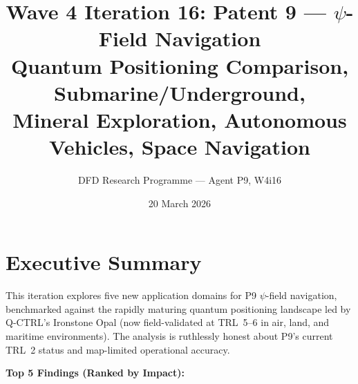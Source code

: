 \documentclass[11pt]{article}
\title{\textbf{Wave 4 Iteration 16: Patent 9 --- $\psi$-Field Navigation}\\[6pt]
Quantum Positioning Comparison, Submarine/Underground,\\
Mineral Exploration, Autonomous Vehicles, Space Navigation}
\author{DFD Research Programme --- Agent P9, W4i16}
\date{20 March 2026}
\theoremstyle{definition}
\theoremstyle{remark}
\begin{document}
\maketitle
\tableofcontents
\newpage

\section*{Executive Summary}

This iteration explores five new application domains for P9 $\psi$-field
navigation, benchmarked against the rapidly maturing quantum positioning
landscape led by Q-CTRL's Ironstone Opal (now field-validated at TRL~5--6
in air, land, and maritime environments). The analysis is ruthlessly honest
about P9's current TRL~2 status and map-limited operational accuracy.

\textbf{Top 5 Findings (Ranked by Impact):}
\end{document}

